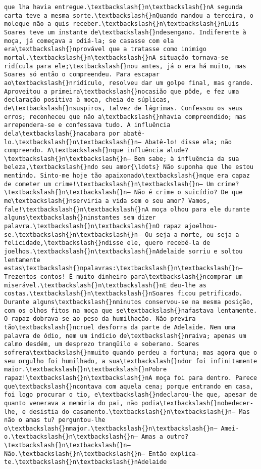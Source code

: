 \documentclass[11pt]{article}
\begin{document}
\begin{Verbatim}[commandchars=\\\{\}]
que lha havia entregue.\textbackslash{}n\textbackslash{}nA segunda carta teve a mesma sorte.\textbackslash{}nQuando mandou a terceira, o moleque não a quis receber.\textbackslash{}n\textbackslash{}nLuís Soares teve um instante de\textbackslash{}ndesengano. Indiferente à moça, já começava a odiá-la; se casasse com ela era\textbackslash{}nprovável que a tratasse como inimigo mortal.\textbackslash{}n\textbackslash{}nA situação tornava-se ridícula para ele;\textbackslash{}nou antes, já o era há muito, mas Soares só então o compreendeu. Para escapar ao\textbackslash{}nridículo, resolveu dar um golpe final, mas grande. Aproveitou a primeira\textbackslash{}nocasião que pôde, e fez uma declaração positiva à moça, cheia de súplicas, de\textbackslash{}nsuspiros, talvez de lágrimas. Confessou os seus erros; reconheceu que não a\textbackslash{}nhavia compreendido; mas arrependera-se e confessava tudo. A influência dela\textbackslash{}nacabara por abatê-lo.\textbackslash{}n\textbackslash{}n— Abatê-lo! disse ela; não compreendo. A\textbackslash{}nque influência alude?\textbackslash{}n\textbackslash{}n— Bem sabe; à influência da sua beleza,\textbackslash{}ndo seu amor{\ldots} Não suponha que lhe estou mentindo. Sinto-me hoje tão apaixonado\textbackslash{}nque era capaz de cometer um crime!\textbackslash{}n\textbackslash{}n— Um crime?\textbackslash{}n\textbackslash{}n— Não é crime o suicídio? De que me\textbackslash{}nserviria a vida sem o seu amor? Vamos, fale!\textbackslash{}n\textbackslash{}nA moça olhou para ele durante alguns\textbackslash{}ninstantes sem dizer palavra.\textbackslash{}n\textbackslash{}nO rapaz ajoelhou-se.\textbackslash{}n\textbackslash{}n— Ou seja a morte, ou seja a felicidade,\textbackslash{}ndisse ele, quero recebê-la de joelhos.\textbackslash{}n\textbackslash{}nAdelaide sorriu e soltou lentamente estas\textbackslash{}npalavras:\textbackslash{}n\textbackslash{}n— Trezentos contos! É muito dinheiro para\textbackslash{}ncomprar um miserável.\textbackslash{}n\textbackslash{}nE deu-lhe as costas.\textbackslash{}n\textbackslash{}nSoares ficou petrificado. Durante alguns\textbackslash{}nminutos conservou-se na mesma posição, com os olhos fitos na moça que se\textbackslash{}nafastava lentamente. O rapaz dobrava-se ao peso da humilhação. Não previra tão\textbackslash{}ncruel desforra da parte de Adelaide. Nem uma palavra de ódio, nem um indício de\textbackslash{}nraiva; apenas um calmo desdém, um desprezo tranqüilo e soberano. Soares sofrera\textbackslash{}nmuito quando perdeu a fortuna; mas agora que o seu orgulho foi humilhado, a sua\textbackslash{}ndor foi infinitamente maior.\textbackslash{}n\textbackslash{}nPobre rapaz!\textbackslash{}n\textbackslash{}nA moça foi para dentro. Parece que\textbackslash{}ncontava com aquela cena; porque entrando em casa, foi logo procurar o tio, e\textbackslash{}ndeclarou-lhe que, apesar de quanto venerava a memória do pai, não podia\textbackslash{}nobedecer-lhe, e desistia do casamento.\textbackslash{}n\textbackslash{}n— Mas não o amas tu? perguntou-lhe o\textbackslash{}nmajor.\textbackslash{}n\textbackslash{}n— Amei-o.\textbackslash{}n\textbackslash{}n— Amas a outro?\textbackslash{}n\textbackslash{}n— Não.\textbackslash{}n\textbackslash{}n— Então explica-te.\textbackslash{}n\textbackslash{}nAdelaide 
\end{Verbatim}
\end{document}
